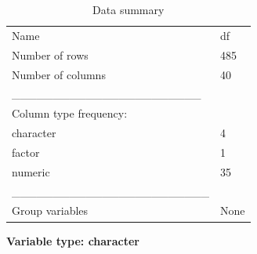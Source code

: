 \documentclass[
  letterpaper,
  DIV=11,
  numbers=noendperiod]{scrartcl}
\begin{document}
\begin{longtable}[]{@{}ll@{}}
\caption{Data summary}\tabularnewline
\toprule\noalign{}
\endfirsthead
\endhead
\bottomrule\noalign{}
\endlastfoot
Name & df \\
Number of rows & 485 \\
Number of columns & 40 \\
\_\_\_\_\_\_\_\_\_\_\_\_\_\_\_\_\_\_\_\_\_\_\_ & \\
Column type frequency: & \\
character & 4 \\
factor & 1 \\
numeric & 35 \\
\_\_\_\_\_\_\_\_\_\_\_\_\_\_\_\_\_\_\_\_\_\_\_\_ & \\
Group variables & None \\
\end{longtable}

\textbf{Variable type: character}
\end{document}
